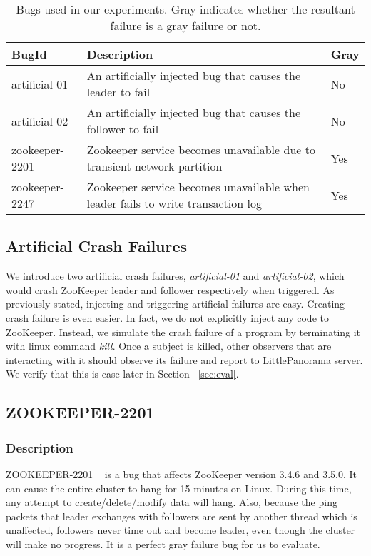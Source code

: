 \begin{table}[!tb]
\begin{tabular}{p{}p{}p{}}%

\toprule
\textbf{BugId} & \textbf{Description} & \textbf{Gray} \\
\midrule
    artificial-01   &    An artificially injected bug that causes the leader to fail  &  No  \\
    artificial-02      &   An artificially injected bug that causes the follower to fail  &  No  \\  
zookeeper-2201      &   Zookeeper service becomes unavailable due to transient network partition &  Yes \\
zookeeper-2247      &   Zookeeper service becomes unavailable when leader fails to write transaction log &  Yes \\
\bottomrule
\end{tabular}
\vspace{0.5em}
\caption{Bugs used in our experiments. Gray indicates whether the resultant failure is a gray failure or not.}
\label{tab:failures}
\end{table}

\subsection{Artificial Crash Failures}
We introduce two artificial crash failures, \textit{artificial-01} and \textit{artificial-02}, which would crash ZooKeeper leader and follower respectively when triggered. As previously stated, injecting and triggering artificial failures are easy. Creating crash failure is even easier. In fact, we do not explicitly inject any code to ZooKeeper. Instead, we simulate the crash failure of a program by terminating it with linux command \textit{kill}. Once a subject is killed, other observers that are interacting with it should observe its failure and report to LittlePanorama server. We verify that this is case later in Section ~\ref{sec:eval}.


\subsection{ZOOKEEPER-2201}
\label{ssec:rob}
\subsubsection{Description}
ZOOKEEPER-2201 ~\cite{httpsiss99:online} is a bug that affects ZooKeeper version 3.4.6 and 3.5.0. It can cause the entire cluster to hang for 15 minutes on Linux.  During this time, any attempt to create/delete/modify data will hang. Also, because the ping packets that leader exchanges with followers are sent by another thread which is unaffected, followers never time out and become leader, even though the cluster will make no progress. It is a perfect gray failure bug for us to evaluate. 

